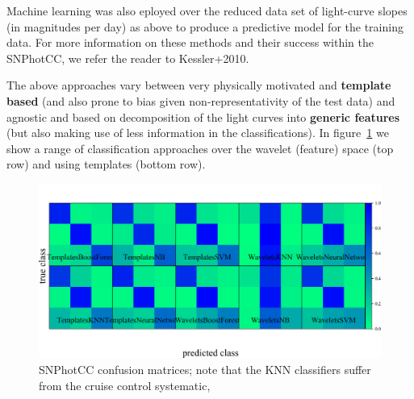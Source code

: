 Machine learning was also eployed over the reduced data set of light-curve slopes (in magnitudes per day) as above to produce a predictive model for the training data.
For more information on these methods and their success within the SNPhotCC, we refer the reader to Kessler+2010.

The above approaches vary between very physically motivated and \textbf{template based} (and also prone to bias given non-representativity of the test data) and agnostic and based on decomposition of the light curves into \textbf{generic features} (but also making use of less information in the classifications).
In figure~\ref{fig:snphotcc_cm} we show a range of classification approaches over the wavelet (feature) space (top row) and using templates (bottom row).

\begin{figure}
	\begin{center}
    \includegraphics[width=\textwidth]{./fig/all_snphotcc_cm.png}
		\caption{SNPhotCC confusion matrices; note that the KNN classifiers suffer from the cruise control systematic, }
		\label{fig:snphotcc_cm}
	\end{center}
\end{figure}



%
